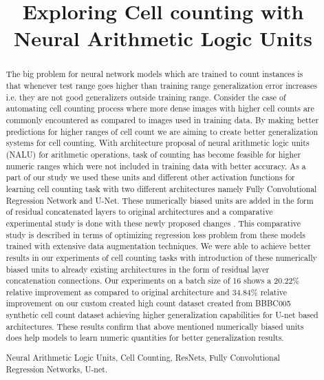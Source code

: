 \documentclass[conference]{IEEEtran}
\begin{document}
\title{Exploring Cell counting with Neural Arithmetic Logic Units}

\author{
}

\maketitle

\begin{abstract}

The big problem for neural network models which are trained to count instances is that whenever test range goes higher than training range generalization error increases i.e. they are not good generalizers outside training range. Consider the case of automating cell counting process where more dense images with higher cell counts are commonly encountered as compared to images used in training data. By making better predictions for higher ranges of cell count we are aiming to create better generalization systems for cell counting. With architecture proposal of neural arithmetic logic units (NALU) for arithmetic operations, task of counting has become feasible for higher numeric ranges which were not included in training data with better accuracy. As a part of our study we used these units and different other activation functions for learning cell counting task with two different architectures namely Fully Convolutional Regression Network and U-Net. These numerically biased units are added in the form of residual concatenated layers to original architectures and a comparative experimental study is done with these newly proposed changes . This comparative study is described in terms of optimizing regression loss problem from these models trained with extensive data augmentation techniques. We were able to achieve better results in our experiments of cell counting tasks with introduction of these numerically biased units to already existing architectures in the form of residual layer concatenation connections. Our experiments on a batch size of 16 shows a 20.22\% relative improvement as compared to original architecture and 34.84\% relative improvement on our custom created high count dataset created from BBBC005 synthetic cell count dataset achieving higher generalization capabilities for U-net based architectures. These results confirm that above mentioned numerically biased units does help models to learn numeric quantities for better generalization results.

\begin{IEEEkeywords}
Neural Arithmetic Logic Units, Cell Counting, ResNets, Fully Convolutional Regression Networks, U-net.
\end{IEEEkeywords}

\end{abstract}
\end{document}
